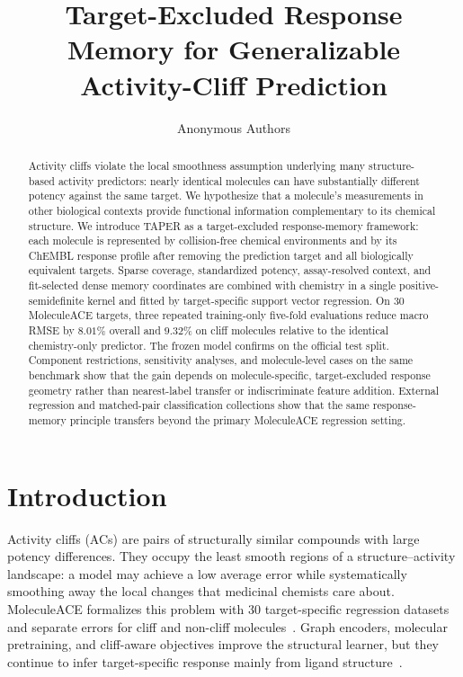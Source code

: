 \documentclass[manuscript,nonacm]{acmart}
\newcommand{\method}{TAPER\xspace}
\newcommand{\mace}{MoleculeACE\xspace}
\begin{document}
\title{Target-Excluded Response Memory for Generalizable Activity-Cliff Prediction}

\author{Anonymous Authors}
\renewcommand{\shortauthors}{Anonymous et al.}

\begin{abstract}
Activity cliffs violate the local smoothness assumption underlying many
structure-based activity predictors: nearly identical molecules can have
substantially different potency against the same target. We hypothesize that a
molecule's measurements in other biological contexts provide functional
information complementary to its chemical structure. We introduce \method as a
target-excluded response-memory framework: each molecule is represented by
collision-free chemical environments and by its ChEMBL response profile after
removing the prediction target and all biologically equivalent targets. Sparse
coverage, standardized potency, assay-resolved context, and fit-selected dense
memory coordinates are combined with chemistry in a single
positive-semidefinite kernel and fitted by target-specific support vector
regression. On 30 MoleculeACE targets, three repeated training-only five-fold
evaluations reduce macro RMSE by $8.01\%$ overall and $9.32\%$ on cliff
molecules relative to the identical chemistry-only predictor. The frozen model
confirms on the official test split. Component restrictions, sensitivity
analyses, and molecule-level cases on the same benchmark show that the gain
depends on molecule-specific, target-excluded response geometry rather than
nearest-label transfer or indiscriminate feature addition. External regression
and matched-pair classification collections show that the same response-memory
principle transfers beyond the primary MoleculeACE regression setting.
\end{abstract}


\maketitle

\section{Introduction}
Activity cliffs (ACs) are pairs of structurally similar compounds with large
potency differences. They occupy the least smooth regions of a
structure--activity landscape: a model may achieve a low average error while
systematically smoothing away the local changes that medicinal chemists care
about. \mace formalizes this problem with 30 target-specific regression
datasets and separate errors for cliff and non-cliff molecules~\cite{moleculeace}.
Graph encoders, molecular pretraining, and cliff-aware objectives improve the
structural learner, but they continue to infer target-specific response mainly
from ligand structure~\cite{scage,graphcliff,acanets}.
\end{document}

